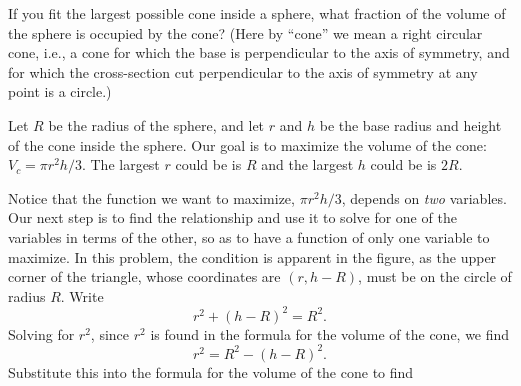 \documentclass{ximera}
\begin{document}
\begin{example}
If you fit the largest possible cone inside a sphere, what fraction of the
volume of the sphere is occupied by the cone?  (Here by ``cone'' we mean a
right circular cone, i.e., a cone for which the base is perpendicular to
the axis of symmetry, and for which the cross-section cut perpendicular to
the axis of symmetry at any point is a circle.)
\begin{image}
\end{image}
\begin{explanation}
Let $R$ be the radius of the sphere, and let $r$ and $h$ be the base
radius and height of the cone inside the sphere.  Our goal is to
maximize the volume of the cone: $V_c=\pi r^2h/3$.  The largest $r$
could be is $R$ and the largest $h$ could be is $2R$.

Notice that the function we want to maximize, $\pi r^2h/3$, depends on
\textit{two} variables.  Our next step is to find the relationship and
use it to solve for one of the variables in terms of the other, so as
to have a function of only one variable to maximize.  In this problem,
the condition is apparent in the figure, as the upper corner of the
triangle, whose coordinates are $(r,h-R)$, must be on the circle of
radius $R$. Write
\[
r^2 + (h-R)^2=R^2.
\] 
Solving for $r^2$, since $r^2$ is found in the formula for the volume
of the cone, we find 
\[
r^2=R^2-(h-R)^2.
\]  
Substitute this into the formula for the volume of the cone to find


\end{explanation}
\end{example}
\end{document}
